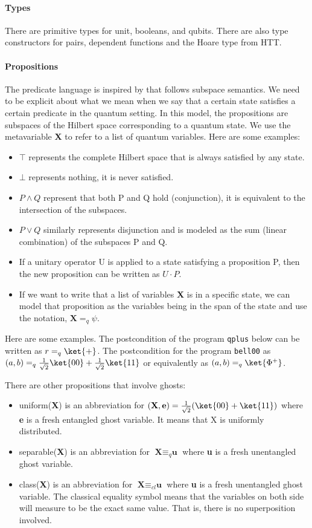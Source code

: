 \documentclass[acmsmall,nonacm,timestamp,review=false,anonymous=false]{acmart}
\begin{document}
\paragraph{Types} There are primitive types for unit, booleans, and qubits. There are also type constructors for pairs, dependent functions and the Hoare type from HTT.

\paragraph{Propositions}
The predicate language is inspired by \citet{unruh2019} that follows subspace semantics. We need to be explicit about what we mean when we say that a certain state satisfies a certain predicate in the quantum setting. In this model, the propositions are subspaces of the Hilbert space corresponding to a quantum state. We use the metavariable \textbf{X} to refer to a list of quantum variables. Here are some examples:
\begin{itemize}
	\item $\top$ represents the complete Hilbert space that is always satisfied by any state.
	\item $\bot$ represents nothing, it is never satisfied.
	\item $P \wedge Q$ represent that both P and Q hold (conjunction), it is equivalent to the intersection of the subspaces.
	\item $P \vee Q$ similarly represents disjunction and is modeled as the sum (linear combination) of the subspaces P and Q.
	\item If a unitary operator U is applied to a state satisfying a proposition P, then the new proposition can be written as $U \cdot P$.
	\item If we want to write that a list of variables \textbf{X} is in a specific state, we can model that proposition as the variables being in the span of the state and use the notation, $\textbf{X} =_q \psi$.
\end{itemize}

Here are some examples. The postcondition of the program \texttt{qplus} below can be written as $r =_q \ket{+}$. The postcondition for the program \texttt{bell00} as $(a, b) =_q \frac{1}{\sqrt{2}}\ket{00}+\frac{1}{\sqrt{2}}\ket{11}$ or equivalently as $(a, b) =_q \ket{\Phi^+}$.

There are other propositions that involve ghosts:
\begin{itemize}
	\item uniform(\textbf{X}) is an abbreviation for $(\textbf{X}, \textbf{e}) = \frac{1}{\sqrt{2}}(\ket{00}+\ket{11})$ where \textbf{e} is  a fresh entangled ghost variable. It means that X is uniformly distributed.
	\item separable(\textbf{X}) is an abbreviation for $\textbf{X} \equiv_{q} \textbf{u}$ where \textbf{u} is a fresh unentangled ghost variable.
	\item class(\textbf{X}) is an abbreviation for $\textbf{X} \equiv_{cl} \textbf{u}$ where \textbf{u} is a fresh unentangled ghost variable. The classical equality symbol means that the variables on both side will measure to be the exact same value. That is, there is no superposition involved.
\end{itemize}
\end{document}
